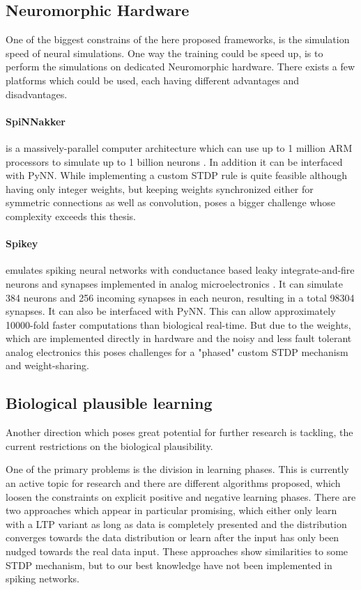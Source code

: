 \subsection{Neuromorphic Hardware} \label{c:neuhard}

One of the biggest constrains of the here proposed frameworks, is the simulation speed of neural simulations.
One way the training could be speed up, is to perform the simulations on dedicated Neuromorphic hardware. 
There exists a few platforms which could be used, each having different advantages and disadvantages.

\paragraph{SpiNNakker} \label{c:spinnakker}
is a massively-parallel computer architecture which can use up to 1 million ARM processors to simulate up to 1 billion neurons \cite{jin2008efficient}. 
In addition it can be interfaced with PyNN. 
While implementing a custom STDP rule is quite feasible although having only integer weights, but keeping weights synchronized either for symmetric connections as well as convolution, poses a bigger challenge whose complexity exceeds this thesis.

\paragraph{Spikey} \label{c:spikey}
emulates spiking neural networks with conductance based leaky integrate-and-fire neurons and synapses implemented in analog microelectronics \cite{Pfeil1311}.
It can simulate 384 neurons and 256 incoming synapses in each neuron, resulting in a total 98304 synapses.
It can also be interfaced with PyNN.
This can allow approximately 10000-fold faster computations than biological real-time.
But due to the weights, which are implemented directly in hardware and the noisy and less fault tolerant analog electronics this poses challenges for a "phased" custom STDP mechanism and weight-sharing. 

\subsection{Biological plausible learning} \label{c:biofuture}

Another direction which poses great potential for further research is tackling, the current restrictions on the biological plausibility.  

One of the primary problems is the division in learning phases.
This is currently an active topic for research and there are different algorithms proposed, which loosen the constraints on explicit positive and negative learning phases.
There are two approaches which appear in particular promising, which either only learn with a LTP variant as long as data is completely presented and the distribution converges towards the data distribution or learn after the input has only been nudged towards the real data input\cite{DBLP:journals/corr/ScellierB16}\cite{Scellier2016a}.
These approaches show similarities to some STDP mechanism, but to our best knowledge have not been implemented in spiking networks.

